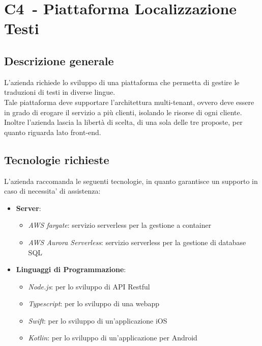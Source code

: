 
\renewcommand{\capName}{Piattaforma Localizzazione Testi} %
\renewcommand{\capCode}{C4} %
\renewcommand{\capLink}{https://www.math.unipd.it/~tullio/IS-1/2022/Progetto/C3.pdf} %
\renewcommand{\capProposer}{zero12} %


\section{\capCode\ - \capName} 
\subsection{Descrizione generale}
L'azienda richiede lo sviluppo di una piattaforma che permetta di gestire le traduzioni di testi in diverse lingue. \\
Tale piattaforma deve supportare l'architettura multi-tenant, ovvero deve essere in grado di erogare il servizio a più clienti, isolando le risorse di ogni cliente. \\
Inoltre l'azienda lascia la libertà di scelta, di una sola delle tre proposte, per quanto riguarda lato front-end. \\


\subsection{Tecnologie richieste}
L'azienda raccomanda le seguenti tecnologie, in quanto garantisce un supporto in caso di necessita' di assistenza:
\begin{itemize}
    \item \textbf{Server}: 
        \begin{itemize}
            \item \emph{AWS fargate}: servizio serverless per la gestione a container
            \item \emph{AWS Aurora Serverless}: servizio serverless per la gestione di database SQL
        \end{itemize}
    \item \textbf{Linguaggi di Programmazione}: 
        \begin{itemize}
            \item \emph{Node.js}: per lo sviluppo di API Restful
            \item \emph{Typescript}: per lo sviluppo di una webapp
            \item \emph{Swift}: per lo sviluppo di un'applicazione iOS
            \item \emph{Kotlin}: per lo sviluppo di un'applicazione per Android
        \end{itemize}
\end{itemize}

